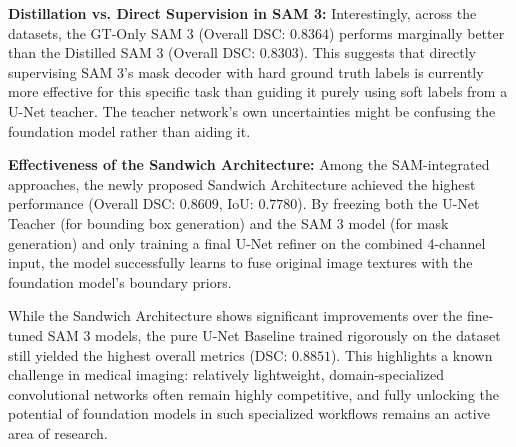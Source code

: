 \textbf{Distillation vs. Direct Supervision in SAM 3:}
Interestingly, across the datasets, the GT-Only SAM 3 (Overall DSC: $0.8364$) performs marginally better than the Distilled SAM 3 (Overall DSC: $0.8303$). This suggests that directly supervising SAM 3's mask decoder with hard ground truth labels is currently more effective for this specific task than guiding it purely using soft labels from a U-Net teacher. The teacher network's own uncertainties might be confusing the foundation model rather than aiding it.

\textbf{Effectiveness of the Sandwich Architecture:}
Among the SAM-integrated approaches, the newly proposed Sandwich Architecture achieved the highest performance (Overall DSC: $0.8609$, IoU: $0.7780$). By freezing both the U-Net Teacher (for bounding box generation) and the SAM 3 model (for mask generation) and only training a final U-Net refiner on the combined 4-channel input, the model successfully learns to fuse original image textures with the foundation model's boundary priors. 

While the Sandwich Architecture shows significant improvements over the fine-tuned SAM 3 models, the pure U-Net Baseline trained rigorously on the dataset still yielded the highest overall metrics (DSC: $0.8851$). This highlights a known challenge in medical imaging: relatively lightweight, domain-specialized convolutional networks often remain highly competitive, and fully unlocking the potential of foundation models in such specialized workflows remains an active area of research.
